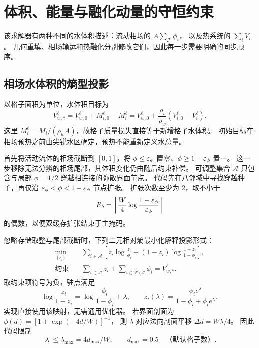 \section{体积、能量与融化动量的守恒约束}
\label{sec:constraints}
该求解器有两种不同的水体积描述：流动相场的 $A\sum_{\mathcal F}\phi_i$，
以及热系统的 $\sum_iV_i$。
几何重填、相场输运和热融化分别修改它们，因此每一步需要明确的同步顺序。

\subsection{相场水体积的熵型投影}
\label{sec:phase-projection}
以格子面积为单位，水体积目标为
\begin{equation}
 V_{w,*}^{\ell}=V_{w,0}^{\ell}+M_{i,0}^{\ell}-M_i^{\ell}
 =V_{w,0}^{\ell}+\frac{\rho_i}{\rho_w}
 (V_{i,0}^{\ell}-V_i^{\ell}).
 \label{eq:volume-target}
\end{equation}
这里 $M_i^\ell=M_i/(\rho_wA)$，故格子质量损失直接等于新增格子水体积。
初始目标在相场预热之前由尖锐水区确定，预热不能重新定义水总量。

首先将活动流体的相场截断到 $[0,1]$，将
$\phi\leq\varepsilon_\phi$ 置零、$\phi\geq1-\varepsilon_\phi$ 置一。
这一步移除无法分辨的相场尾部，其体积变化仍由随后约束补偿。
可调整集合 $\mathcal A$ 只包含与局部 $\phi=1/2$ 穿越相连接的弥散界面节点。
代码先在八邻域中寻找穿越种子，再仅沿
$\varepsilon_\phi<\phi<1-\varepsilon_\phi$ 节点扩张。
扩张次数至少为 2，取不小于
\begin{equation}
 R_b=\left\lceil\frac W4\log\frac{1-\varepsilon_\phi}{\varepsilon_\phi}\right\rceil
\end{equation}
的偶数，以便双缓存扩张结束于主掩码。

忽略存储取整与尾部截断时，下列二元相对熵最小化解释投影形式：
\begin{align}
 \min_{\{z_i\}}\quad&\sum_{i\in\mathcal A}
 \left[z_i\log\frac{z_i}{\phi_i}+(1-z_i)\log\frac{1-z_i}{1-\phi_i}\right],\\
 \text{约束}\quad&\sum_{i\in\mathcal A}z_i+
 \sum_{i\in\mathcal F\setminus\mathcal A}\phi_i=V_{w,*}^{\ell}.
\end{align}
取约束项符号为负，驻点满足
\begin{equation}
 \log\frac{z_i}{1-z_i}=\log\frac{\phi_i}{1-\phi_i}+\lambda,
 \qquad z_i(\lambda)=\frac{\phi_i e^\lambda}{1-\phi_i+\phi_ie^\lambda}.
 \label{eq:logistic}
\end{equation}
实现直接使用该映射，无需通用优化器。
若界面剖面为 $\phi(d)=[1+\exp(-4d/W)]^{-1}$，
则 $\lambda$ 对应法向剖面平移 $\Delta d=W\lambda/4$。
因此代码限制
\begin{equation}
 |\lambda|\leq\lambda_{\max}=4d_{\max}/W,
 \qquad d_{\max}=0.5\quad\text{（默认格子数）}.
\end{equation}

